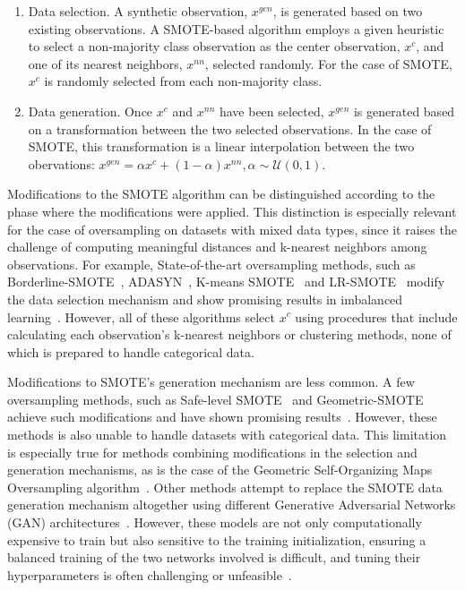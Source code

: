 \documentclass[parskip=full]{scrartcl}
\begin{document}
\begin{enumerate}
    \item Data selection. A synthetic observation, $x^{gen}$, is generated based
        on two existing observations. A SMOTE-based algorithm employs a given
        heuristic to select a non-majority class observation as the center
        observation, $x^c$, and one of its nearest neighbors, $x^{nn}$,
        selected randomly. For the case of SMOTE, $x^c$ is randomly selected
        from each non-majority class.
    \item Data generation. Once $x^c$ and $x^{nn}$ have been selected, $x^{gen}$
        is generated based on a transformation between the two selected
        observations. In the case of SMOTE, this transformation is 
        a linear interpolation between the two obervations: $x^{gen} = \alpha x^c
        + (1-\alpha) x^{nn}, \alpha \sim \mathcal{U}(0, 1)$.
\end{enumerate}

Modifications to the SMOTE algorithm can be distinguished according to the
phase where the modifications were applied. This distinction is especially
relevant for the case of oversampling on datasets with mixed data types, since
it raises the challenge of computing meaningful distances and k-nearest
neighbors among observations. For example, State-of-the-art oversampling
methods, such as Borderline-SMOTE~\cite{han2005borderline},
ADASYN~\cite{he2008adasyn}, K-means SMOTE~\cite{douzas2018improving} and
LR-SMOTE~\cite{liang2020lr} modify the data selection mechanism and show
promising results in imbalanced learning~\cite{fonseca2021improving}. However,
all of these algorithms select $x^c$ using procedures that include calculating
each observation's k-nearest neighbors or clustering methods, none of which is
prepared to handle categorical data.

Modifications to SMOTE's generation mechanism are less common. A few
oversampling methods, such as Safe-level SMOTE~\cite{bunkhumpornpat2009safe}
and Geometric-SMOTE~\cite{douzas2019geometric} achieve such modifications and
have shown promising results~\cite{douzas2019imbalanced}. However, these
methods is also unable to handle datasets with categorical data. This
limitation is especially true for methods combining modifications in the
selection and generation mechanisms, as is the case of the Geometric
Self-Organizing Maps Oversampling algorithm~\cite{douzas2021g}. Other methods
attempt to replace the SMOTE data generation mechanism altogether using
different Generative Adversarial Networks (GAN)
architectures~\cite{salazar2021generative, koivu2020synthetic, jo2022obgan}.
However, these models are not only computationally expensive to train but also
sensitive to the training initialization, ensuring a balanced training of the
two networks involved is difficult, and tuning their hyperparameters is often
challenging or unfeasible~\cite{gonog2019review}. 
\end{document}
